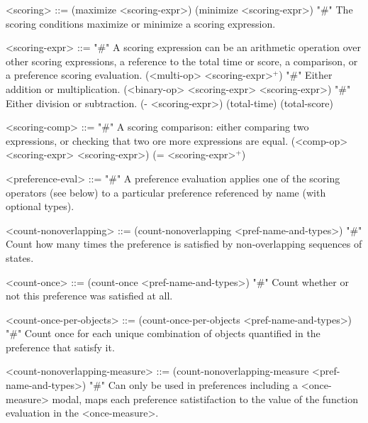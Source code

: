 \documentclass{article}
\begin{document}
\begin{grammar}
<scoring> ::= (maximize <scoring-expr>) \alt (minimize <scoring-expr>) "#" The scoring conditions maximize or minimize a scoring expression.

<scoring-expr> ::= "#" A scoring expression can be an arithmetic operation over other scoring expressions, a reference to the total time or score, a comparison, or a preference scoring evaluation.
        \alt (<multi-op> <scoring-expr>$^+$) "#" Either addition or multiplication.
        \alt (<binary-op> <scoring-expr> <scoring-expr>) "#" Either division or subtraction.
        \alt (- <scoring-expr>)
        \alt (total-time)
        \alt (total-score)



<scoring-comp> ::=  "#" A scoring comparison: either comparing two expressions, or checking that two ore more expressions are equal.
        \alt (<comp-op> <scoring-expr> <scoring-expr>)
        \alt (= <scoring-expr>$^+$)


<preference-eval> ::= "#" A preference evaluation applies one of the scoring operators (see below) to a particular preference referenced by name (with optional types).



<count-nonoverlapping> ::= (count-nonoverlapping <pref-name-and-types>) "#" Count how many times the preference is satisfied by non-overlapping sequences of states.

<count-once> ::= (count-once <pref-name-and-types>) "#" Count whether or not this preference was satisfied at all.

<count-once-per-objects> ::= (count-once-per-objects <pref-name-and-types>) "#" Count once for each unique combination of objects quantified in the preference that satisfy it.

<count-nonoverlapping-measure> ::= (count-nonoverlapping-measure <pref-name-and-types>) "#" Can only be used in preferences including a <once-measure> modal, maps each preference satistifaction to the value of the function evaluation in the <once-measure>.


\end{grammar}
\end{document}
